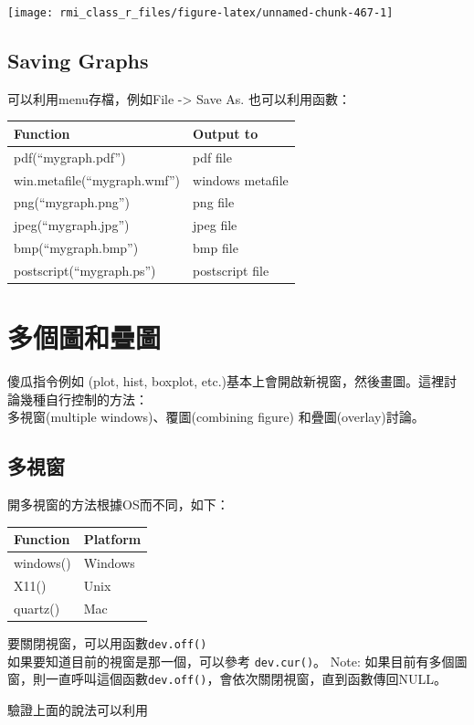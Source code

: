 \documentclass[]{book}
\theoremstyle{definition}
\theoremstyle{definition}
\theoremstyle{definition}
\theoremstyle{remark}
\begin{document}
\begin{center}\texttt{[image: rmi\_class\_r\_files/figure-latex/unnamed-chunk-467-1]} \end{center}

\hypertarget{saving-graphs}{%
\subsection{Saving Graphs}\label{saving-graphs}}

可以利用menu存檔，例如File -\textgreater{} Save As. 也可以利用函數：

\begin{longtable}[]{@{}ll@{}}
\toprule
Function & Output to\tabularnewline
\midrule
\endhead
pdf(``mygraph.pdf'') & pdf file\tabularnewline
win.metafile(``mygraph.wmf'') & windows metafile\tabularnewline
png(``mygraph.png'') & png file\tabularnewline
jpeg(``mygraph.jpg'') & jpeg file\tabularnewline
bmp(``mygraph.bmp'') & bmp file\tabularnewline
postscript(``mygraph.ps'') & postscript file\tabularnewline
\bottomrule
\end{longtable}

\section{多個圖和疊圖}

傻瓜指令例如 (plot, hist, boxplot,
etc.)基本上會開啟新視窗，然後畫圖。這裡討論幾種自行控制的方法：\\
多視窗(multiple windows)、覆圖(combining figure) 和疊圖(overlay)討論。

\subsection{多視窗}

開多視窗的方法根據OS而不同，如下：

\begin{longtable}[]{@{}ll@{}}
\toprule
Function & Platform\tabularnewline
\midrule
\endhead
windows() & Windows\tabularnewline
X11() & Unix\tabularnewline
quartz() & Mac\tabularnewline
\bottomrule
\end{longtable}

要關閉視窗，可以用函數\texttt{dev.off()}\\
如果要知道目前的視窗是那一個，可以參考 \texttt{dev.cur()}。 Note:
如果目前有多個圖窗，則一直呼叫這個函數\texttt{dev.off()}，會依次關閉視窗，直到函數傳回NULL。

驗證上面的說法可以利用
\end{document}
